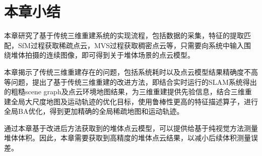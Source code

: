 \section{本章小结}
\label{sec:3.4}
本章研究了基于传统三维重建系统的实现流程，包括数据的采集，特征的提取匹配，SfM过程获取稀疏点云，MVS过程获取稠密点云等，只需要向系统中输入围绕堆体拍摄的连续图像，即可得到关于堆体场景的点云模型。

本章揭示了传统三维重建存在的问题，包括系统耗时以及点云模型结果精确度不高等问题，提出了基于传统三维重建的改进方法，即结合实时运行的SLAM系统得出的粗糙scene graph及点云环境地图结果，为三维重建提供先验信息，结合三维重建全局大尺度地图及运动轨迹的优化目标，使用鲁棒性更高的特征描述算子，进行全局BA优化，得到更加精确的全局稀疏地图和运动轨迹。

通过本章基于改进后方法获取到的堆体点云模型，可以提供给基于纯视觉方法测量堆体体积。因此，本章需要获取到高精度的堆体点云结果，以减小后续体积测量误差。
